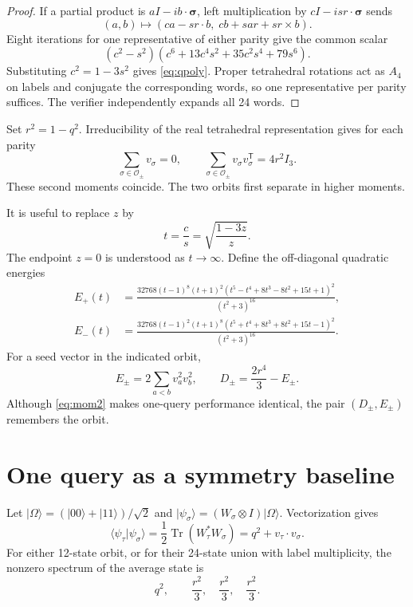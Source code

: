 \documentclass[11pt]{article}
\theoremstyle{definition}
\DeclareMathOperator{\Tr}{Tr}
\newcommand{\cO}{\mathcal O}
\newcommand{\ket}[1]{\lvert #1\rangle}
\begin{document}
\begin{proof}
If a partial product is $aI-i b\cdot\bm\sigma$, left multiplication by
$cI-isr\cdot\bm\sigma$ sends
\[
 (a,b)\longmapsto(ca-sr\cdot b,\;cb+sar+s r\times b).
\]
Eight iterations for one representative of either parity give the common
scalar
\[
 (c^2-s^2)(c^6+13c^4s^2+35c^2s^4+79s^6).
\]
Substituting $c^2=1-3s^2$ gives \cref{eq:qpoly}.  Proper tetrahedral
rotations act as $A_4$ on labels and conjugate the corresponding words, so one
representative per parity suffices.  The verifier independently expands all
24 words.
\end{proof}

Set $r^2=1-q^2$.  Irreducibility of the real tetrahedral representation gives
for each parity
\begin{equation}\label{eq:mom2}
 \sum_{\sigma\in\cO_\pm}v_\sigma=0,
 \qquad
 \sum_{\sigma\in\cO_\pm}v_\sigma v_\sigma^{\mathsf T}
 =4r^2 I_3.
\end{equation}
These second moments coincide.  The two orbits first separate in higher
moments.

It is useful to replace $z$ by
\[
 t=\frac{c}{s}=\sqrt{\frac{1-3z}{z}}.
\]
The endpoint $z=0$ is understood as $t\to\infty$.  Define the off-diagonal
quadratic energies
\begin{align}
E_+(t)&=\frac{32768(t-1)^8(t+1)^2
 (t^5-t^4+8t^3-8t^2+15t+1)^2}{(t^2+3)^{16}},\label{eq:Eplus}\\
E_-(t)&=\frac{32768(t-1)^2(t+1)^8
 (t^5+t^4+8t^3+8t^2+15t-1)^2}{(t^2+3)^{16}}.\label{eq:Eminus}
\end{align}
For a seed vector in the indicated orbit,
\[
 E_\pm=2\sum_{a<b}v_a^2v_b^2,
 \qquad D_\pm=\frac{2r^4}{3}-E_\pm.
\]
Although \cref{eq:mom2} makes one-query performance identical, the pair
$(D_\pm,E_\pm)$ remembers the orbit.

\section{One query as a symmetry baseline}

Let $\ket\Omega=(\ket{00}+\ket{11})/\sqrt2$ and
$\ket{\psi_\sigma}=(W_\sigma\otimes I)\ket\Omega$.  Vectorization gives
\[
 \langle\psi_\tau|\psi_\sigma\rangle
 =\frac12\Tr(W_\tau^*W_\sigma)
 =q^2+v_\tau\cdot v_\sigma.
\]
For either 12-state orbit, or for their 24-state union with label
multiplicity, the nonzero spectrum of the average state is
\begin{equation}\label{eq:one-spectrum}
 q^2,\qquad \frac{r^2}{3},\quad\frac{r^2}{3},\quad\frac{r^2}{3}.
\end{equation}
\end{document}
